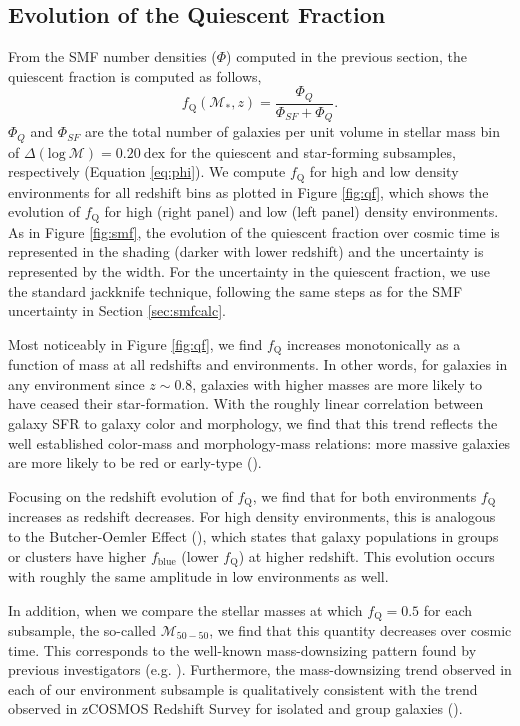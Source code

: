 \subsection{Evolution of the Quiescent Fraction} \label{sec:qfevol}
From the SMF number densities ($\Phi$) computed in the previous section, the quiescent fraction is computed as follows, 
\begin{equation}
f_{\mathrm{Q}} ( \mathcal{M}_{*}, z)= \frac{\Phi_{Q}}{\Phi_{SF}+\Phi_{Q}}.
\end{equation}
$\Phi_{Q}$ and $\Phi_{SF}$ are the total number of galaxies per unit
volume in stellar mass bin of $\Delta(\mathrm{log} \: \mathcal{M}) = 0.20
\: \mathrm{dex}$ for the quiescent and star-forming subsamples,
respectively (Equation \ref{eq:phi}). We compute $f_{\mathrm{Q}}$ for high
and low density environments for all redshift bins as plotted in
Figure \ref{fig:qf}, which shows the evolution of $f_{\mathrm{Q}}$ for
high (right panel) and low (left panel) density environments. As in
Figure \ref{fig:smf}, the evolution of the quiescent fraction over
cosmic time is represented in the shading (darker with lower redshift)
and the uncertainty is represented by the width. For the uncertainty
in the quiescent fraction, we use the standard jackknife technique,
following the same steps as for the SMF uncertainty in Section \ref{sec:smfcalc}. 

Most noticeably in Figure \ref{fig:qf}, we find $f_{\mathrm{Q}}$ increases
monotonically as a function of mass at all redshifts and
environments. In other words, for galaxies in any environment since $ z \sim 0.8$, galaxies with higher
masses are more likely to have ceased their star-formation. With the roughly linear correlation between galaxy SFR to galaxy color and morphology, we find that this trend reflects the well established color-mass and morphology-mass relations: more massive galaxies are more likely to be red or early-type (\citealt{blanton09a}). 

Focusing on the redshift evolution of $f_{\mathrm{Q}}$, we find that for
both environments $f_{\mathrm{Q}}$ increases as redshift decreases. For
high density environments, this is analogous to the Butcher-Oemler
Effect (\citealt{Butcher:1984aa}), which states that galaxy
populations in groups or clusters have higher $f_{\mathrm{blue}}$ 
(lower $f_{\mathrm{Q}}$) at higher redshift. This evolution occurs with
roughly the same amplitude in low environments as well.

In addition, when we compare the stellar masses at which $f_{\mathrm{Q}} =
0.5$ for each subsample, the so-called $\mathcal{M}_{50-50}$, we find
that this quantity decreases over cosmic time. This corresponds to the
well-known mass-downsizing pattern found by previous investigators
(e.g. \citealt{bundy06a}). Furthermore, the mass-downsizing trend
observed in each of our environment subsample is qualitatively
consistent with the trend observed in zCOSMOS Redshift Survey for
isolated and group galaxies (\citealt{Iovino:2010aa}).

